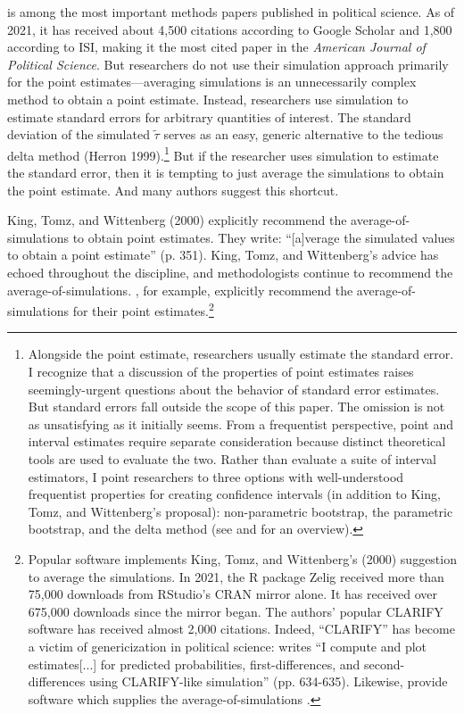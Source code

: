\documentclass[12pt]{article}
\begin{document}
\cite{KingTomzWittenberg2000} is among the most important methods papers published in political science. As of 2021, it has received about 4,500 citations according to Google Scholar and 1,800 according to ISI, making it the most cited paper in the \textit{American Journal of Political Science}. But researchers do not use their simulation approach primarily for the point estimates---averaging simulations is an unnecessarily complex method to obtain a point estimate. Instead, researchers use simulation to estimate standard errors for arbitrary quantities of interest. The standard deviation of the simulated $\tilde{\tau}$ serves as an easy, generic alternative to the tedious delta method (Herron 1999).\footnote{Alongside the point estimate, researchers usually estimate the standard error. I recognize that a discussion of the properties of point estimates raises seemingly-urgent questions about the behavior of standard error estimates. But standard errors fall outside the scope of this paper. The omission is not as unsatisfying as it initially seems. From a frequentist perspective, point and interval estimates require separate consideration because distinct theoretical tools are used to evaluate the two. Rather than evaluate a suite of interval estimators, I point researchers to three options with well-understood frequentist properties for creating confidence intervals (in addition to King, Tomz, and Wittenberg's proposal): non-parametric bootstrap, the parametric bootstrap, and the delta method (see \citealt{EfronTibshirani1993} and \citealt{Efron2021} for an overview). } But if the researcher uses simulation to estimate the standard error, then it is tempting to just average the simulations to obtain the point estimate. And many authors suggest this shortcut.

King, Tomz, and Wittenberg (2000) explicitly recommend the average-of-simulations to obtain point estimates. They write: ``[a]verage the simulated values to obtain a point estimate'' (p. 351). King, Tomz, and Wittenberg's advice has echoed throughout the discipline, and methodologists continue to recommend the average-of-simulations. \cite{Zhirnov2022}, for example, explicitly recommend the average-of-simulations for their point estimates.\footnote{Popular software implements King, Tomz, and Wittenberg's (2000) suggestion to average the simulations. In 2021, the R package Zelig \citep{Choiratetal} received more than 75,000 downloads from RStudio's CRAN mirror alone. It has received over 675,000 downloads since the mirror began. The authors' popular CLARIFY software \citep{TomzWittenbergKing2003} has received almost 2,000 citations. Indeed, ``CLARIFY'' has become a victim of genericization in political science: \cite{Rainey2016} writes ``I compute and plot estimates[...] for predicted probabilities, first-differences, and second-differences using CLARIFY-like simulation'' (pp. 634-635). Likewise, \cite{Zhirnov2022} provide software which supplies the average-of-simulations \citep{zhirnov2022a, zhirnov2022b}.}
\end{document}
